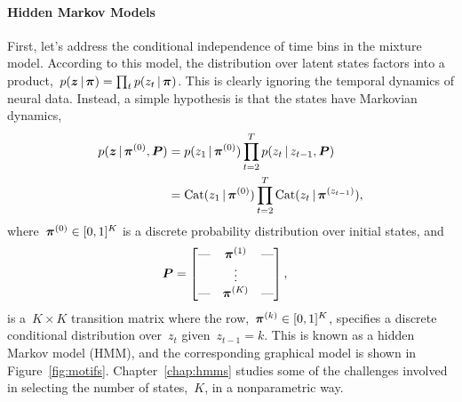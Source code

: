 
\paragraph{Hidden Markov Models}
First, let's address the conditional independence of time bins in the
mixture model. According to this model, the distribution over latent
states factors into a product,~${p(\boldsymbol{z} \,|\, \boldsymbol{\pi}) = \prod_t p(z_t
  \,|\, \boldsymbol{\pi})}$.  This is clearly ignoring the temporal dynamics of
neural data. Instead, a simple hypothesis is that the states have
Markovian dynamics,
\begin{align*}
  p(\boldsymbol{z} \,|\, \boldsymbol{\pi}^{(0)}, \boldsymbol{P}) &= p(z_1 \,|\, \boldsymbol{\pi}^{(0)}) \prod_{t=2}^T p(z_t \,|\, z_{t-1}, \boldsymbol{P}) \\ 
  &= \mathrm{Cat}(z_1 \,|\, \boldsymbol{\pi}^{(0)}) \prod_{t=2}^T \mathrm{Cat}(z_t \,|\, \boldsymbol{\pi}^{(z_{t-1})}),
\end{align*}
where~$\boldsymbol{\pi}^{(0)} \in [0,1]^K$ is a discrete probability distribution over
initial states, and
\begin{align*}
  \boldsymbol{P} &=
        \begin{bmatrix}
          \text{---} &  \boldsymbol{\pi}^{(1)}  & \text{---} \\
            &  \vdots &   \\
          \text{---} &  \boldsymbol{\pi}^{(K)}  & \text{---}
        \end{bmatrix},
\end{align*}
is a~${K \times K}$ transition matrix where the row,~${\boldsymbol{\pi}^{(k)} \in
  [0,1]^K}$, specifies a discrete conditional distribution over~$z_t$
given~${z_{t-1}=k}$.  This is known as a hidden Markov model (HMM),
and the corresponding graphical model is shown in
Figure~\ref{fig:motifs}. Chapter~\ref{chap:hmms} studies some of the
challenges involved in selecting the number of states,~$K$, in a
nonparametric way.

